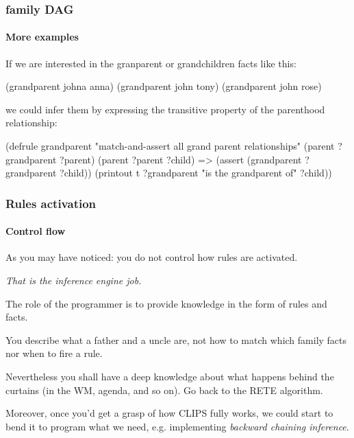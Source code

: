 \documentclass[xcolor={usenames,dvipsnames,svgnames}, compress]{beamer}
\begin{document}
\begin{frame}[fragile]
  \frametitle{family DAG}
  \framesubtitle{More examples}

  If we are interested in the granparent or grandchildren facts like this:
  \begin{clips-code}[numbers=none]
    (grandparent johna anna) (grandparent john tony)
    (grandparent john rose)
  \end{clips-code}

  we could infer them by expressing the transitive property of the parenthood relationship:
  
  \begin{clips-code}[numbers=none]
    (defrule grandparent
        "match-and-assert all grand parent relationships"
        (parent ?grandparent ?parent)
        (parent ?parent ?child)
        =>
        (assert (grandparent ?grandparent ?child))
        (printout t ?grandparent "is the grandparent of" ?child))
  \end{clips-code}
\end{frame}






\begin{frame}
  \frametitle{Rules activation}
  \framesubtitle{Control flow}
  As you may have noticed: you do not control how rules are
  activated.\par
  \begin{center}
    \emph{That is the inference engine job.}
  \end{center}
  The role of the programmer is to provide knowledge in the form of
  rules and facts.\bigskip

  You describe what a father and a uncle are, not how to match which
  family facts nor when to fire a rule.

  Nevertheless you shall have a deep knowledge about what happens
  behind the curtains (in the WM, agenda, and so on). Go back to the
  RETE algorithm.\par\bigskip

  Moreover, once you'd get a grasp of how CLIPS fully works, we could
  start to bend it to program what we need, e.g. implementing \emph{backward chaining inference}.
\end{frame}
\end{document}
